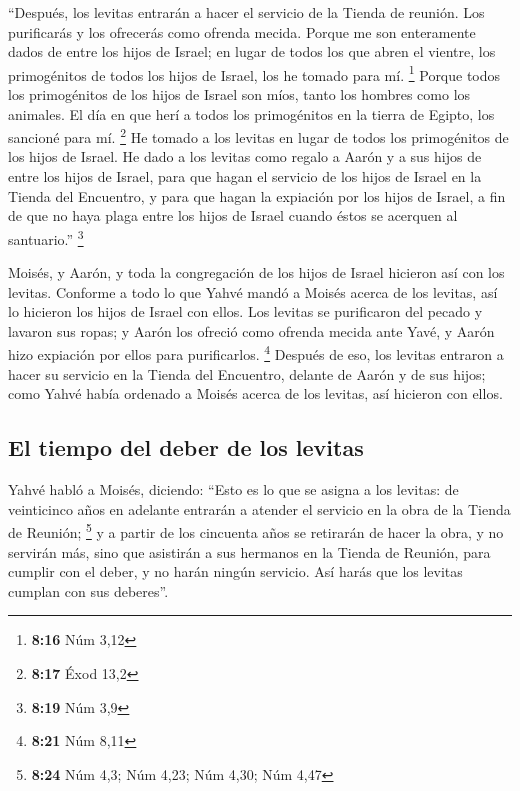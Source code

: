  ``Después, los levitas entrarán a hacer el servicio de
la Tienda de reunión. Los purificarás y los ofrecerás como ofrenda
mecida.  Porque me son enteramente dados de entre los
hijos de Israel; en lugar de todos los que abren el vientre, los
primogénitos de todos los hijos de Israel, los he tomado para mí.
\footnote{\textbf{8:16} Núm 3,12}  Porque todos los
primogénitos de los hijos de Israel son míos, tanto los hombres como los
animales. El día en que herí a todos los primogénitos en la tierra de
Egipto, los sancioné para mí. \footnote{\textbf{8:17} Éxod 13,2}
 He tomado a los levitas en lugar de todos los
primogénitos de los hijos de Israel.  He dado a los
levitas como regalo a Aarón y a sus hijos de entre los hijos de Israel,
para que hagan el servicio de los hijos de Israel en la Tienda del
Encuentro, y para que hagan la expiación por los hijos de Israel, a fin
de que no haya plaga entre los hijos de Israel cuando éstos se acerquen
al santuario.'' \footnote{\textbf{8:19} Núm 3,9}

 Moisés, y Aarón, y toda la congregación de los hijos de
Israel hicieron así con los levitas. Conforme a todo lo que Yahvé mandó
a Moisés acerca de los levitas, así lo hicieron los hijos de Israel con
ellos.  Los levitas se purificaron del pecado y lavaron
sus ropas; y Aarón los ofreció como ofrenda mecida ante Yavé, y Aarón
hizo expiación por ellos para purificarlos. \footnote{\textbf{8:21} Núm
  8,11}  Después de eso, los levitas entraron a hacer su
servicio en la Tienda del Encuentro, delante de Aarón y de sus hijos;
como Yahvé había ordenado a Moisés acerca de los levitas, así hicieron
con ellos.

\hypertarget{el-tiempo-del-deber-de-los-levitas}{%
\subsection{El tiempo del deber de los
levitas}\label{el-tiempo-del-deber-de-los-levitas}}

 Yahvé habló a Moisés, diciendo:  ``Esto
es lo que se asigna a los levitas: de veinticinco años en adelante
entrarán a atender el servicio en la obra de la Tienda de Reunión;
\footnote{\textbf{8:24} Núm 4,3; Núm 4,23; Núm 4,30; Núm 4,47}
 y a partir de los cincuenta años se retirarán de hacer
la obra, y no servirán más,  sino que asistirán a sus
hermanos en la Tienda de Reunión, para cumplir con el deber, y no harán
ningún servicio. Así harás que los levitas cumplan con sus deberes''.

